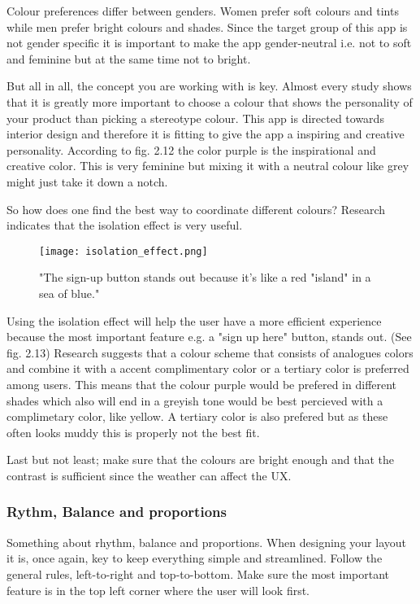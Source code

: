 Colour preferences differ between genders. Women prefer soft colours and tints while men prefer bright colours and shades. \cite{ColorMeaning} Since the target group of this app is not gender specific it is important to make the app gender-neutral i.e. not to soft and feminine but at the same time not to bright. 

But all in all, the concept you are working with is key. Almost every study shows that it is greatly more important to choose a colour that shows the personality of your product than picking a stereotype colour. \cite{ColorMeaning} This app is directed towards interior design and therefore it is fitting to give the app a inspiring and creative personality. According to fig. 2.12 the color purple is the inspirational and creative color. This is very feminine but mixing it with a neutral colour like grey might just take it down a notch. 

So how does one find the best way to coordinate different colours? Research indicates that the isolation effect is very useful.

\begin{figure}[H]
\centering
\texttt{[image: isolation\_effect.png]}
\caption{"The sign-up button stands out because it's like a red "island" in a sea of blue." \cite{ColorMeaning}}
\end{figure}

Using the isolation effect will help the user have a more efficient experience because the most important feature e.g. a "sign up here" button, stands out. \cite{ColorMeaning} (See fig. 2.13)
Research suggests that a colour scheme that consists of analogues colors and combine it with a accent complimentary color or a tertiary color is preferred among users. \cite{ColorMeaning} 
This means that the colour purple would be prefered in different shades which also will end in a greyish tone would be best percieved with a complimetary color, like yellow. A tertiary color is also prefered but as these often looks muddy this is properly not the best fit.

Last but not least; make sure that the colours are bright enough and that the contrast is sufficient since the weather can affect the UX. \cite{Graphic}

\subsubsection{Rythm, Balance and proportions}
Something about rhythm, balance and proportions. \cite{DesignPrinciple} %
When designing your layout it is, once again, key to keep everything simple and streamlined. 
Follow the general rules, left-to-right and top-to-bottom. Make sure the most important feature is in the top left corner where the user will look first.\cite{Graphic}

